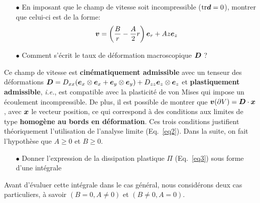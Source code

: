 \documentclass[french,english,12pt]{exam}
\begin{document}
\begin{itemize}
\item[$\bullet$] En imposant que le champ de vitesse soit incompressible ($\mathrm{tr}\boldsymbol{d} = 0$), montrer que celui-ci est de la forme:\\
\begin{equation}
  \boldsymbol{v} = \left( \frac{B}{r} -  \frac{A}{2}r \right)  \boldsymbol{e}_r +  A z \boldsymbol{e}_z 
\end{equation}
\end{itemize}

\begin{itemize}
\item[$\bullet$] Comment s'écrit le taux de déformation macroscopique $\boldsymbol{D}$ ? \\
\end{itemize}
  
\noindent
Ce champ de vitesse est \textbf{cinématiquement admissible} avec un tenseur des déformations $\boldsymbol{D} = D_{xx} (\boldsymbol{e}_x \otimes \boldsymbol{e}_x + \boldsymbol{e}_y \otimes \boldsymbol{e}_y) + D_{zz} \boldsymbol{e}_z \otimes \boldsymbol{e}_z $ et \textbf{plastiquement admissible}, \textit{i.e.}, est compatible avec la plasticité de von Mises qui impose un écoulement incompressible. De plus, il est possible de montrer que $\boldsymbol{v}(\partial V) = \boldsymbol{D} \cdot \boldsymbol{x}$, avec $\boldsymbol{x}$ le vecteur position, ce qui correspond à des conditions aux limites de type \textbf{homogène au bords en déformation}. Ces trois conditions justifient théoriquement l'utilisation de l'analyse limite (Eq.~\ref{eq2}). Dans la suite, on fait l'hypothèse que $A \geq 0$ et $B \geq 0$.\\

\begin{itemize}
\item[$\bullet$] Donner l'expression de la dissipation plastique $\Pi$ (Eq.~\ref{eq3}) sous forme d'une intégrale\\
\end{itemize}

\noindent
Avant d'évaluer cette intégrale dans le cas général, nous considérons deux cas particuliers, à savoir $(B = 0, A \neq 0)$ et  $(B \neq 0, A = 0)$.\\
\end{document}
